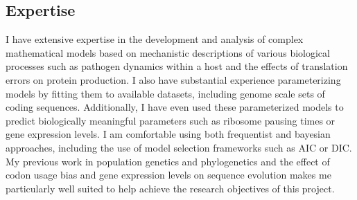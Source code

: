 \documentclass[10pt]{article}
\begin{document}



\subsection*{Expertise}
I have extensive expertise in the development and analysis of complex mathematical models based on mechanistic descriptions of various biological processes such as pathogen dynamics within a host and the effects of translation errors on protein production.
I also have substantial experience parameterizing models by fitting them to available datasets, including genome scale sets of coding sequences.
Additionally, I have even used these parameterized models  to predict biologically meaningful parameters such as ribosome pausing times or gene expression levels.
I am comfortable using both frequentist and bayesian approaches, including the use of model selection frameworks such as AIC or DIC.
My previous work in population genetics and  phylogenetics and the effect of codon usage bias and gene expression levels on sequence evolution makes me particularly well suited to help achieve the research objectives of this project.
\end{document}

